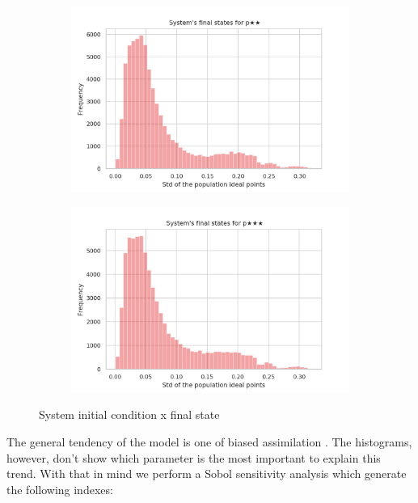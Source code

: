 \documentclass{article}
\begin{document}
\begin{figure}[H]
     \begin{subfigure}[b]{0.49\textwidth}
       \includegraphics[width=\textwidth]{img/Ystd**.png}
     \end{subfigure}
     \begin{subfigure}[b]{0.49\textwidth}
       \includegraphics[width=\textwidth]{img/Ystd***.png}
     \end{subfigure}
     \label{fig:hists}
     \caption{System initial condition x final state}
    \end{figure}

    The general tendency of the model is one of biased assimilation
    \cite{flache2017}. The histograms, however, don't show which parameter is
    the most important to explain this trend. With that in mind we perform a
    Sobol sensitivity analysis \cite{saltelli2000sensitivity} which generate the
    following indexes:
\end{document}
